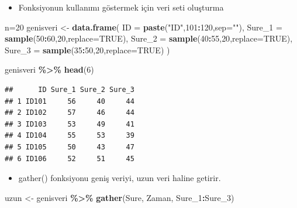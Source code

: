 \documentclass[
  oneside]{book}
\newenvironment{Shaded}{\begin{snugshade}}{\end{snugshade}}
\newcommand{\AttributeTok}[1]{\textcolor[rgb]{0.13,0.29,0.53}{#1}}
\newcommand{\ConstantTok}[1]{\textcolor[rgb]{0.56,0.35,0.01}{#1}}
\newcommand{\DecValTok}[1]{\textcolor[rgb]{0.00,0.00,0.81}{#1}}
\newcommand{\FunctionTok}[1]{\textcolor[rgb]{0.13,0.29,0.53}{\textbf{#1}}}
\newcommand{\NormalTok}[1]{#1}
\newcommand{\OtherTok}[1]{\textcolor[rgb]{0.56,0.35,0.01}{#1}}
\newcommand{\SpecialCharTok}[1]{\textcolor[rgb]{0.81,0.36,0.00}{\textbf{#1}}}
\newcommand{\StringTok}[1]{\textcolor[rgb]{0.31,0.60,0.02}{#1}}
\providecommand{\tightlist}{%
  \setlength{\itemsep}{0pt}\setlength{\parskip}{0pt}}
\begin{document}
\begin{itemize}
\tightlist
\item
  Fonksiyonun kullanımı göstermek için veri seti oluşturma
\end{itemize}

\begin{Shaded}
\begin{Highlighting}[]
\NormalTok{n}\OtherTok{=}\DecValTok{20}
\NormalTok{genisveri }\OtherTok{\textless{}{-}} \FunctionTok{data.frame}\NormalTok{(}
  \AttributeTok{ID =} \FunctionTok{paste}\NormalTok{(}\StringTok{"ID"}\NormalTok{,}\DecValTok{101}\SpecialCharTok{:}\DecValTok{120}\NormalTok{,}\AttributeTok{sep=}\StringTok{""}\NormalTok{),}
  \AttributeTok{Sure\_1 =} \FunctionTok{sample}\NormalTok{(}\DecValTok{50}\SpecialCharTok{:}\DecValTok{60}\NormalTok{,}\DecValTok{20}\NormalTok{,}\AttributeTok{replace=}\ConstantTok{TRUE}\NormalTok{),}
  \AttributeTok{Sure\_2 =} \FunctionTok{sample}\NormalTok{(}\DecValTok{40}\SpecialCharTok{:}\DecValTok{55}\NormalTok{,}\DecValTok{20}\NormalTok{,}\AttributeTok{replace=}\ConstantTok{TRUE}\NormalTok{),}
  \AttributeTok{Sure\_3 =} \FunctionTok{sample}\NormalTok{(}\DecValTok{35}\SpecialCharTok{:}\DecValTok{50}\NormalTok{,}\DecValTok{20}\NormalTok{,}\AttributeTok{replace=}\ConstantTok{TRUE}\NormalTok{)}
\NormalTok{)}
\end{Highlighting}
\end{Shaded}

\begin{Shaded}
\begin{Highlighting}[]
\NormalTok{genisveri }\SpecialCharTok{\%\textgreater{}\%} \FunctionTok{head}\NormalTok{(}\DecValTok{6}\NormalTok{)}
\end{Highlighting}
\end{Shaded}

\begin{verbatim}
##      ID Sure_1 Sure_2 Sure_3
## 1 ID101     56     40     44
## 2 ID102     57     46     44
## 3 ID103     53     49     41
## 4 ID104     55     53     39
## 5 ID105     50     43     47
## 6 ID106     52     51     45
\end{verbatim}

\begin{itemize}
\tightlist
\item
  gather() fonksiyonu geniş veriyi, uzun veri haline getirir.
\end{itemize}

\begin{Shaded}
\begin{Highlighting}[]
\NormalTok{uzun }\OtherTok{\textless{}{-}}\NormalTok{ genisveri }\SpecialCharTok{\%\textgreater{}\%} \FunctionTok{gather}\NormalTok{(Sure, Zaman, Sure\_1}\SpecialCharTok{:}\NormalTok{Sure\_3)}
\end{Highlighting}
\end{Shaded}
\end{document}
